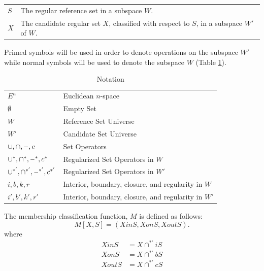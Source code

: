 \documentclass[a4paper,11pt,oneside]{article}
\makeatletter
\newcommand{\minus}{\scalebox{0.9}[1.0]{$-$}} %
\newenvironment{conditions}
  {\par\vspace{\abovedisplayskip}\noindent\begin{tabular}{>{$}l<{$} @{${}={}$} l}}
  {\end{tabular}\par\vspace{\belowdisplayskip}}
\makeatother
\begin{document}
\begin{conditions}
	S     &  The regular reference set in a subspace $W$. \\
	X     &  The candidate regular set $X$, classified with respect to $S$, in a subspace $W'$ of $W$. \\
\end{conditions}

Primed symbols will be used	in order to denote operations on the subspace $W'$ while normal symbols will be used to denote the subspace $W$ (Table \ref{table:notations}).
 
\begin{table}
	\caption{Notation}
	\label{table:notations}
	\begin{tabularx}{\textwidth}{p{}X}
		\toprule
		$E^n$                                       & Euclidean $n$-space                                 \\
		$\emptyset$                                 & Empty Set                                           \\
		$W$                                         & Reference Set Universe                              \\
		$W'$                                        & Candidate Set Universe                              \\
		$\cup, \cap, \minus, c$                     & Set Operators                                       \\
		$\cup^*, \cap^*, \minus^*, c^*$             & Regularized Set Operators in $W$                    \\
		$\cup^{*'}, \cap^{*'}, \minus^{*'}, c^{*'}$ & Regularized Set Operators in $W'$                   \\
		$i, b, k, r$                                & Interior, boundary, closure, and regularity in $W$  \\
		$i', b', k', r'$                            & Interior, boundary, closure, and regularity in $W'$ \\
		\bottomrule
	\end{tabularx}
\end{table}

\begin{definition}
	The membership classification function, $M$ is defined as follows:
	\begin{equation}
		M[X, S] = (XinS, XonS, XoutS).
	\end{equation}
	where
	\begin{align*}
		XinS  & = X \cap^{*'} iS \\
		XonS  & = X \cap^{*'} bS \\
		XoutS & = X \cap^{*'} cS 
	\end{align*}
\end{definition}
\end{document}
